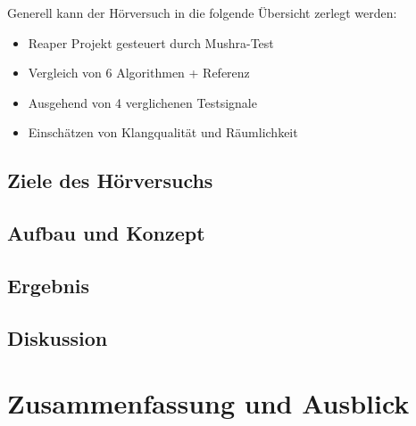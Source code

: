 \documentclass[12pt, a4paper]{article}
\begin{document}
Generell kann der Hörversuch in die folgende Übersicht zerlegt werden:
\begin{itemize}
    \item Reaper Projekt gesteuert durch Mushra-Test
    \item Vergleich von 6 Algorithmen + Referenz
    \item Ausgehend von 4 verglichenen Testsignale
    \item Einschätzen von Klangqualität und Räumlichkeit
\end{itemize}

    \subsection{Ziele des Hörversuchs}
    
    \subsection{Aufbau und Konzept}
    
    \subsection{Ergebnis}
    
    \subsection{Diskussion}
    

\section{Zusammenfassung und Ausblick}




\end{document}
